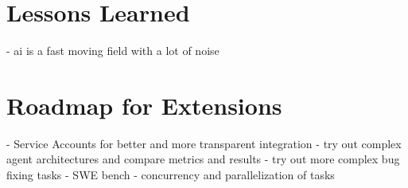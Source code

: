 \section{Lessons Learned}
- ai is a fast moving field with a lot of noise


\section{Roadmap for Extensions}
- Service Accounts for better and more transparent integration
- try out complex agent architectures and compare metrics and results
- try out more complex bug fixing tasks - SWE bench
- concurrency and parallelization of tasks